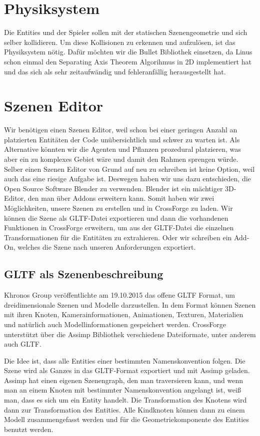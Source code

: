 \section{Physiksystem}

Die Entities und der Spieler sollen mit der statischen Szenengeometrie und sich selber kollidieren. Um diese Kollisionen zu erkennen und aufzulösen, ist das Physiksystem nötig. Dafür möchten wir die Bullet Bibliothek einsetzen, da Linus schon einmal den Separating Axis Theorem Algorihmus in 2D implementiert hat und das sich als sehr zeitaufwändig und fehleranfällig herausgestellt hat. 


\section{Szenen Editor}

Wir benötigen einen Szenen Editor, weil schon bei einer geringen Anzahl an platzierten Entitäten der Code unübersichtlich und schwer zu warten ist. Als Alternative könnten wir die Agenten und Pflanzen prozedural platzieren, was aber ein zu komplexes Gebiet wäre und damit den Rahmen sprengen würde. Selber einen Szenen Editor von Grund auf neu zu schreiben ist keine Option, weil auch das eine riesige Aufgabe ist. Deswegen haben wir uns dazu entschieden, die Open Source Software Blender zu verwenden. Blender ist ein mächtiger 3D-Editor, den man über Addons erweitern kann. Somit haben wir zwei Möglichkeiten, unsere Szenen zu erstellen und in CrossForge zu laden. Wir können die Szene als GLTF-Datei exportieren und dann die vorhandenen Funktionen in CrossForge erweitern, um aus der GLTF-Datei die einzelnen Transformationen für die Entitäten zu extrahieren. Oder wir schreiben ein Add-On, welches die Szene nach unseren Anforderungen exportiert.

\subsection{GLTF als Szenenbeschreibung}

Khronos Group veröffentlichte am 19.10.2015 das offene GLTF Format, um dreidimensionale Szenen und Modelle darzustellen. In dem Format können Szenen mit ihren Knoten, Kamerainformationen, Animationen, Texturen, Materialien und natürlich auch Modellinformationen gespeichert werden. CrossForge unterstützt über die Assimp Bibliothek verschiedene Dateiformate, unter anderem auch GLTF.

Die Idee ist, dass alle Entities einer bestimmten Namenskonvention folgen. Die Szene wird als Ganzes in das GLTF-Format exportiert und mit Assimp geladen. Assimp hat einen eigenen Szenengraph, den man traversieren kann, und wenn man an einem Knoten mit bestimmter Namenskonvention angelangt ist, weiß man, dass es sich um ein Entity handelt. Die Transformation des Knotens wird dann zur Transformation des Entities. Alle Kindknoten können dann zu einem Modell zusammengefasst werden und für die Geometriekomponente des Entities benutzt werden.

